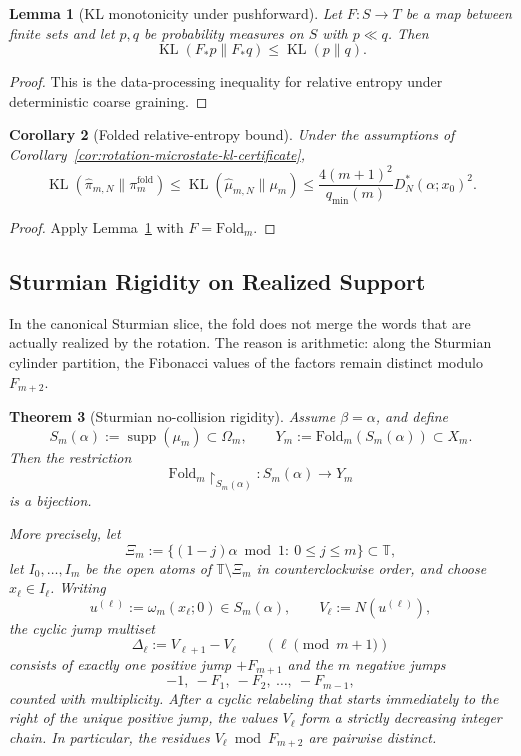 \documentclass[11pt,letterpaper]{article}
\numberwithin{equation}{section}
\theoremstyle{plain}
\newtheorem{theorem}{Theorem}[section]
\newtheorem{lemma}[theorem]{Lemma}
\newtheorem{corollary}[theorem]{Corollary}
\theoremstyle{definition}
\theoremstyle{remark}
\newcommand{\TT}{\mathbb{T}}
\newcommand{\Fold}{\mathrm{Fold}}
\DeclareMathOperator{\KL}{KL}
\DeclareMathOperator{\supp}{supp}
\begin{document}
\begin{lemma}[KL monotonicity under pushforward]\label{lem:kl-monotone-pushforward}
Let $F:S\to T$ be a map between finite sets and let $p,q$ be probability
measures on $S$ with $p\ll q$.  Then
\[
\KL(F_*p\|F_*q)\le \KL(p\|q).
\]
\end{lemma}

\begin{proof}
This is the data-processing inequality for relative entropy under deterministic
coarse graining.
\end{proof}

\begin{corollary}[Folded relative-entropy bound]\label{cor:rotation-folded-kl-certificate}
Under the assumptions of
Corollary~\ref{cor:rotation-microstate-kl-certificate},
\[
\KL(\hat\pi_{m,N}\|\pi_m^{\mathrm{fold}})
\le
\KL(\hat\mu_{m,N}\|\mu_m)
\le
\frac{4(m+1)^2}{q_{\min}(m)}D_N^*(\alpha;x_0)^2.
\]
\end{corollary}

\begin{proof}
Apply Lemma~\ref{lem:kl-monotone-pushforward} with $F=\Fold_m$.
\end{proof}

\subsection{Sturmian Rigidity on Realized Support}

In the canonical Sturmian slice, the fold does not merge the words that are
actually realized by the rotation. The reason is arithmetic: along the
Sturmian cylinder partition, the Fibonacci values of the factors remain
distinct modulo \(F_{m+2}\).

\begin{theorem}[Sturmian no-collision rigidity]\label{thm:sturmian-no-collision-rigidity}
Assume \(\beta=\alpha\), and define
\[
S_m(\alpha):=\supp(\mu_m)\subset\Omega_m,
\qquad
Y_m:=\Fold_m(S_m(\alpha))\subset X_m.
\]
Then the restriction
\[
\Fold_m\!\upharpoonright_{S_m(\alpha)}:S_m(\alpha)\to Y_m
\]
is a bijection.

More precisely, let
\[
\Xi_m:=\{(1-j)\alpha \bmod 1:\ 0\le j\le m\}\subset\TT,
\]
let \(I_0,\dots,I_m\) be the open atoms of \(\TT\setminus \Xi_m\) in
counterclockwise order, and choose \(x_\ell\in I_\ell\). Writing
\[
u^{(\ell)}:=\omega_m(x_\ell;0)\in S_m(\alpha),
\qquad
V_\ell:=N(u^{(\ell)}),
\]
the cyclic jump multiset
\[
\Delta_\ell:=V_{\ell+1}-V_\ell
\qquad (\ell\!\!\!\!\pmod{m+1})
\]
consists of exactly one positive jump \(+F_{m+1}\) and the \(m\) negative
jumps
\[
-1,\ -F_1,\ -F_2,\ \dots,\ -F_{m-1},
\]
counted with multiplicity. After a cyclic relabeling that starts immediately to
the right of the unique positive jump, the values \(V_\ell\) form a strictly
decreasing integer chain. In particular, the residues \(V_\ell\bmod F_{m+2}\)
are pairwise distinct.
\end{theorem}
\end{document}
